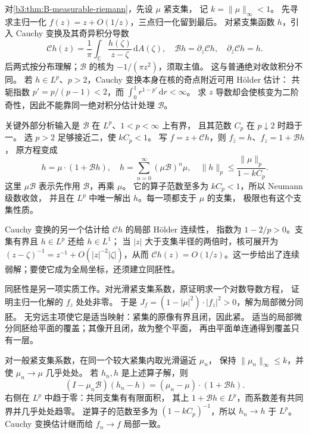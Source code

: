 \begin{proofsketch}
对\cref{b3:thm:B-measurable-riemann}，先设 \(\mu\) 紧支集，
记 \(k=\|\mu\|_\infty<1\)。
先寻求主归一化 \(f(z)=z+O(1/z)\)，三点归一化留到最后。
对紧支集函数 \(h\)，引入 Cauchy 变换及其奇异积分导数
\[
 \mathcal Ch(z)=\frac1\pi\int_{\mathbb C}
              \frac{h(\zeta)}{z-\zeta}\,\mathrm dA(\zeta),\quad
 \mathcal Bh=\partial_z\mathcal Ch,\quad
 \partial_{\bar z}\mathcal Ch=h.
\]
后两式按分布理解；\(\mathcal B\) 的核为 \(-1/(\pi z^2)\)，须取主值。
这与普通绝对收敛积分不同。
若 \(h\in L^p\)、\(p>2\)，Cauchy 变换本身在核的奇点附近可用 Hölder 估计：
共轭指数 \(p'=p/(p-1)<2\)，而
\(\int_0^1 r^{1-p'}\,\mathrm dr<\infty\)。
求 \(z\) 导数却会使核变为二阶奇性，因此不能靠同一绝对积分估计处理 \(\mathcal B\)。

关键外部分析输入是 \(\mathcal B\) 在 \(L^p\)、\(1<p<\infty\) 上有界，
且其范数 \(C_p\) 在 \(p\downarrow2\) 时趋于一。
选 \(p>2\) 足够接近二，使 \(kC_p<1\)。
写 \(f=z+\mathcal Ch\)，则 \(f_{\bar z}=h\)、\(f_z=1+\mathcal Bh\)，
原方程变成
\[
 h=\mu\cdot(1+\mathcal Bh),\quad
 h=\sum_{n=0}^{\infty}(\mu\mathcal B)^n\mu,
 \quad \|h\|_p\le\frac{\|\mu\|_p}{1-kC_p}.
\]
这里 \(\mu\mathcal B\) 表示先作用 \(\mathcal B\)，再乘 \(\mu\)。
它的算子范数至多为 \(kC_p<1\)，所以 Neumann 级数收敛，
并且在 \(L^p\) 中唯一解出 \(h\)。每一项都支于 \(\mu\) 的支集，
极限也有这个支集性质。

Cauchy 变换的另一个估计给 \(\mathcal Ch\) 的局部 Hölder 连续性，
指数为 \(1-2/p>0\)。支集有界且 \(h\in L^p\) 还给 \(h\in L^1\)；
当 \(|z|\) 大于支集半径的两倍时，核可展开为
\((z-\zeta)^{-1}=z^{-1}+O(|z|^{-2}|\zeta|)\)，从而
\(\mathcal Ch(z)=O(1/z)\)。这一步给出了连续弱解；要使它成为全局坐标，还须建立同胚性。

同胚性是另一项实质工作。对光滑紧支集系数，原证明求一个对数导数方程，
证明主归一化解的 \(f_z\) 处处非零。
于是 \(J_f=(1-|\mu|^2)\cdot|f_z|^2>0\)，解为局部微分同胚。
无穷远主项使它是适当映射：紧集的原像有界且闭，因此紧。
适当的局部微分同胚给平面的覆盖；其像开且闭，故为整个平面，
再由平面单连通得到覆盖只有一层。

对一般紧支集系数，在同一个较大紧集内取光滑逼近 \(\mu_n\)，
保持 \(\|\mu_n\|_\infty\le k\)，并使 \(\mu_n\to\mu\) 几乎处处。
若 \(h_n,h\) 是上述算子解，则
\[
 (I-\mu_n\mathcal B)(h_n-h)
       =(\mu_n-\mu)\cdot(1+\mathcal Bh).
\]
右侧在 \(L^p\) 中趋于零：共同支集有有限面积，
其上 \(1+\mathcal Bh\in L^p\)，而系数差有共同界并几乎处处趋零。
逆算子的范数至多为 \((1-kC_p)^{-1}\)，所以 \(h_n\to h\) 于 \(L^p\)。
Cauchy 变换估计继而给 \(f_n\to f\) 局部一致。


\end{proofsketch}
